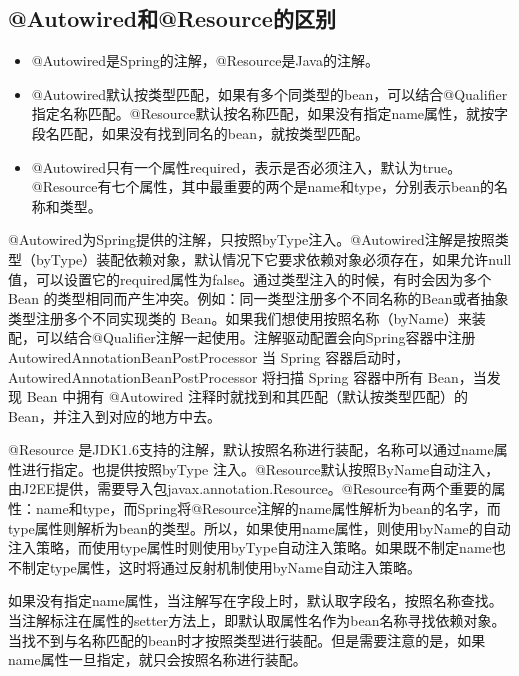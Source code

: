 \documentclass[../../../interview-questions.tex]{subfiles}
\begin{document}
\subsection{@Autowired和@Resource的区别}

\begin{itemize}
    \item {@Autowired是Spring的注解，@Resource是Java的注解。}
    \item {@Autowired默认按类型匹配，如果有多个同类型的bean，可以结合@Qualifier指定名称匹配。@Resource默认按名称匹配，如果没有指定name属性，就按字段名匹配，如果没有找到同名的bean，就按类型匹配。}
    \item {@Autowired只有一个属性required，表示是否必须注入，默认为true。@Resource有七个属性，其中最重要的两个是name和type，分别表示bean的名称和类型。}
\end{itemize}

@Autowired为Spring提供的注解，只按照byType注入。@Autowired注解是按照类型（byType）装配依赖对象，默认情况下它要求依赖对象必须存在，如果允许null值，可以设置它的required属性为false。通过类型注入的时候，有时会因为多个 Bean 的类型相同而产生冲突。例如：同一类型注册多个不同名称的Bean或者抽象类型注册多个不同实现类的 Bean。如果我们想使用按照名称（byName）来装配，可以结合@Qualifier注解一起使用。注解驱动配置会向Spring容器中注册AutowiredAnnotationBeanPostProcessor
当 Spring 容器启动时，AutowiredAnnotationBeanPostProcessor 将扫描 Spring 容器中所有 Bean，当发现 Bean 中拥有 @Autowired 注释时就找到和其匹配（默认按类型匹配）的 Bean，并注入到对应的地方中去。

@Resource 是JDK1.6支持的注解，默认按照名称进行装配，名称可以通过name属性进行指定。也提供按照byType 注入。@Resource默认按照ByName自动注入，由J2EE提供，需要导入包javax.annotation.Resource。@Resource有两个重要的属性：name和type，而Spring将@Resource注解的name属性解析为bean的名字，而type属性则解析为bean的类型。所以，如果使用name属性，则使用byName的自动注入策略，而使用type属性时则使用byType自动注入策略。如果既不制定name也不制定type属性，这时将通过反射机制使用byName自动注入策略。

如果没有指定name属性，当注解写在字段上时，默认取字段名，按照名称查找。
当注解标注在属性的setter方法上，即默认取属性名作为bean名称寻找依赖对象。
当找不到与名称匹配的bean时才按照类型进行装配。但是需要注意的是，如果name属性一旦指定，就只会按照名称进行装配。
\end{document}
